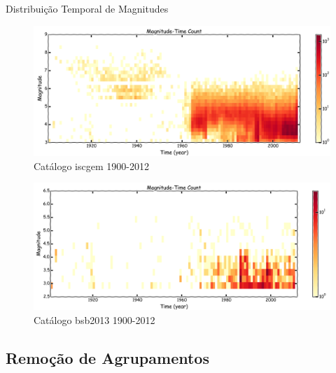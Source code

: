 \documentclass[ucs,8pt]{beamer}
\begin{document}
\begin{frame}{Distribuição Temporal de Magnitudes}
\begin{figure}[H]
	\centering
	\includegraphics[height=0.41\textheight]{time_mag_count_sa}
	\caption{Catálogo \gls{iscgem} 1900-2012}
	\label{fig:tmf_sa}
\end{figure}
\begin{figure}[H]
	\centering
	\includegraphics[height=0.41\textheight]{time_mag_count_br}
	\caption{Catálogo \gls{bsb2013} 1900-2012}
	\label{fig:tmf_br}
\end{figure}%
\end{frame}





\subsection{Remoção de Agrupamentos}
\end{document}

